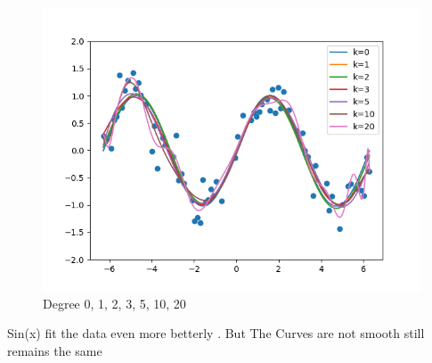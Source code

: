 \begin{answer}

\begin{figure}[h!]
\centering
  \includegraphics[width=.7\linewidth]{featuremaps/5d.png}
\caption{Degree 0, 1, 2, 3, 5, 10, 20}
\label{fig:test}
\end{figure}
Sin(x) fit the data even more betterly . But The Curves are not smooth still remains the same

\end{answer}
